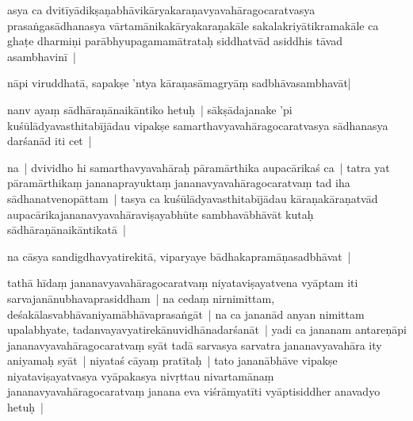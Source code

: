 \documentclass[article,12pt,a4paper]{memoir}%
\newcounter{parCount}
\begin{document}
	  \pstart \leavevmode%
	\label{thakur75-68.20}asya ca dvitīyādikṣaṇabhāvikāryakaraṇavyavahāragocaratvasya prasaṅgasādhanasya vārtamānikakāryakaraṇakāle sakalakriyātikramakāle ca ghaṭe dharmiṇi parābhyupagamamātrataḥ siddhatvād asiddhis tāvad asambhavinī |
	{}
	\pend%
      

	  \pstart \leavevmode%
	\label{thakur75-68.24}nāpi viruddhatā, sapakṣe 'ntya kāraṇasāmagryāṃ sadbhāvasambhavāt| 
	{}
	\pend%
      

	  \pstart \leavevmode%
	\label{thakur75-68.25}nanv ayaṃ sādhāraṇānaikāntiko hetuḥ | sākṣādajanake 'pi kuśūlādyavasthitabījādau vipakṣe samarthavyavahāragocaratvasya sādhanasya darśanād iti cet | 
	{}
	\pend%
      

	  \pstart \leavevmode%
	\label{thakur75-68.26}na | dvividho hi samarthavyavahāraḥ pāramārthika aupacārikaś ca | tatra yat pāramārthikaṃ jananaprayuktaṃ jananavyavahāragocaratvaṃ tad iha sādhanatvenopāttam | tasya ca kuśūlādyavasthitabījādau kāraṇakāraṇatvād aupacārikajananavyavahāraviṣayabhūte sambhavābhāvāt kutaḥ sādhāraṇānaikāntikatā | 
	{}
	\pend%
      

	  \pstart \leavevmode%
	\label{thakur75-69.1}na cāsya sandigdhavyatirekitā, viparyaye bādhakapramāṇasadbhāvat | 
	{}
	\pend%
      

	  \pstart \leavevmode%
	\label{thakur75-69.1a}tathā hīdaṃ jananavyavahāragocaratvaṃ niyataviṣayatvena vyāptam iti sarvajanānubhavaprasiddham | na cedaṃ nirnimittam, deśakālasvabhāvaniyamābhāvaprasaṅgāt | na ca jananād anyan nimittam upalabhyate, tadanvayavyatirekānuvidhānadarśanāt | yadi ca jananam antareṇāpi jananavyavahāragocaratvaṃ syāt tadā sarvasya sarvatra jananavyavahāra ity aniyamaḥ syāt | niyataś cāyaṃ pratītaḥ | tato jananābhāve vipakṣe niyataviṣayatvasya vyāpakasya nivṛttau nivartamānaṃ jananavyavahāragocaratvaṃ janana eva viśrāmyatīti vyāptisiddher anavadyo hetuḥ |
	{}
	\pend%
      
\end{document}
